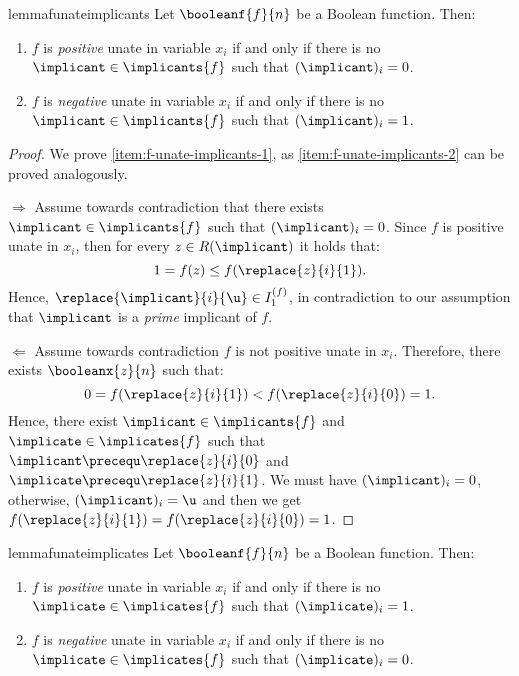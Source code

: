 \documentclass[acmsmall, nonacm, authorversion]{acmart}
\begin{document}
\begin{restatable}{lemma}{funateimplicants}\label{lem:f-unate-implicants}
Let $\booleanf{f}{n}$ be a Boolean function. Then:
\begin{enumerate}
    \item $f$ is \emph{positive} unate in variable $x_{i}$ if and only if there is no $\implicant \in \implicants{f}$ such that $(\implicant)_{i}=0$. \label{item:f-unate-implicants-1}
    \item $f$ is \emph{negative} unate in variable $x_{i}$ if and only if there is no $\implicant \in \implicants{f}$ such that $(\implicant)_{i}=1$.\label{item:f-unate-implicants-2}
\end{enumerate}    
\end{restatable}
\begin{proof}
We prove \eqref{item:f-unate-implicants-1}, as \eqref{item:f-unate-implicants-2} can be proved analogously.

$\Rightarrow$ Assume towards contradiction that there exists $\implicant \in \implicants{f}$ such that $(\implicant)_{i}=0$. Since $f$ is positive unate in $x_{i}$, then for every $z\in R(\implicant)$ it holds that:
\[
    1 = f(z)\le f(\replace{z}{i}{1}).
\]
Hence, $\replace{\implicant}{i}{\u}\in I_{1}^{(f)}$, in contradiction to our assumption that $\implicant$ is a \emph{prime} implicant of $f$.

$\Leftarrow$ Assume towards contradiction $f$ is not positive unate in $x_{i}$. Therefore, there exists $\booleanx{z}{n}$ such that:
\[
    0 = f(\replace{z}{i}{1}) < f(\replace{z}{i}{0}) = 1.
\]
Hence, there exist $\implicant \in \implicants{f}$ and $\implicate \in \implicates{f}$ such that $\implicant \precequ \replace{z}{i}{0}$ and $\implicate \precequ \replace{z}{i}{1}$. We must have $(\implicant)_{i}=0$, otherwise, $(\implicant)_{i}=\u$ and then we get $f(\replace{z}{i}{1}) = f(\replace{z}{i}{0})=1$.
\end{proof}

\begin{restatable}{lemma}{funateimplicates}\label{lem:f-unate-implicates}
Let $\booleanf{f}{n}$ be a Boolean function. Then:
\begin{enumerate}
    \item $f$ is \emph{positive} unate in variable $x_{i}$ if and only if there is no $\implicate \in \implicates{f}$ such that $(\implicate)_{i}=1$. \label{item:f-unate-implicates-1}
    \item $f$ is \emph{negative} unate in variable $x_{i}$ if and only if there is no $\implicate \in \implicates{f}$ such that $(\implicate)_{i}=0$.\label{item:f-unate-implicates-2}
\end{enumerate}    
\end{restatable}
\end{document}
